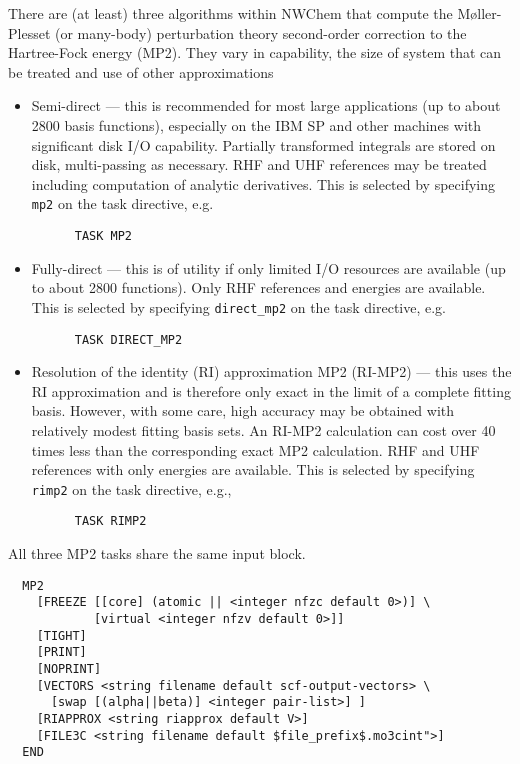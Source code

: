 \label{sec:mp2}
\label{sec:rimp2}

There are (at least) three algorithms within NWChem that compute the
M{\o}ller-Plesset (or many-body) perturbation theory second-order
correction to the Hartree-Fock energy (MP2).  They vary in capability,
the size of system that can be treated and use of other approximations
\begin{itemize}
\item Semi-direct --- this is recommended for most large applications
  (up to about 2800 basis functions), especially on the IBM SP and
  other machines with significant disk I/O capability.  Partially
  transformed integrals are stored on disk, multi-passing as necessary.
  RHF and UHF references may be treated including computation of
  analytic derivatives.  This is selected by specifying \verb+mp2+ on
  the task directive, e.g.
\begin{verbatim}
      TASK MP2
\end{verbatim}
\item Fully-direct --- this is of utility if only limited I/O
  resources are available (up to about 2800 functions).  Only RHF
  references and energies are available. This is selected by
  specifying \verb+direct_mp2+ on the task directive, e.g.
\begin{verbatim}
      TASK DIRECT_MP2
\end{verbatim}
\item Resolution of the identity (RI) approximation MP2 (RI-MP2) ---
  this uses the RI approximation and is therefore only exact in the
  limit of a complete fitting basis.  However, with some care, high
  accuracy may be obtained with relatively modest fitting basis sets.
  An RI-MP2 calculation can cost over 40 times less than the
  corresponding exact MP2 calculation.  RHF and UHF references with
  only energies are available.  This is selected by specifying
  \verb+rimp2+ on the task directive, e.g.,
\begin{verbatim}
      TASK RIMP2
\end{verbatim}
\end{itemize}

All three MP2 tasks share the same input block.

\begin{verbatim}
  MP2
    [FREEZE [[core] (atomic || <integer nfzc default 0>)] \
            [virtual <integer nfzv default 0>]]
    [TIGHT]
    [PRINT]
    [NOPRINT]
    [VECTORS <string filename default scf-output-vectors> \
      [swap [(alpha||beta)] <integer pair-list>] ]
    [RIAPPROX <string riapprox default V>]
    [FILE3C <string filename default $file_prefix$.mo3cint">]
  END
\end{verbatim}

